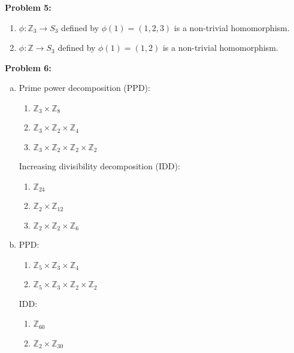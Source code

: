 \documentclass[12pt, letterpaper]{article}
\newenvironment{problem}
    [1]
    {\noindent \textbf{Problem #1:}}
    {\vspace{3mm}}
\begin{document}
\begin{problem}{5}
\begin{enumerate}
        \item $\phi: \mathbb{Z}_3 \rightarrow S_3$ defined by $\phi(1) = (1,2,3)$ is a non-trivial
        homomorphism.

        \item $\phi: \mathbb{Z} \rightarrow S_3$ defined by $\phi(1) = (1,2)$
        is a non-trivial homomorphism.
    \end{enumerate}
\end{problem}

\begin{problem}{6}
    \begin{enumerate}[(a)]
        \item Prime power decomposition (PPD): 
        
        \begin{enumerate}[1.]
            \item $\mathbb{Z}_3 \times \mathbb{Z}_8$
            \item $\mathbb{Z}_3 \times \mathbb{Z}_2 \times \mathbb{Z}_4$
            \item $\mathbb{Z}_3 \times \mathbb{Z}_2 \times \mathbb{Z}_2 \times \mathbb{Z}_2$
        \end{enumerate}
        
        Increasing divisibility decomposition (IDD):
        \begin{enumerate}[1.]
            \item $\mathbb{Z}_{24}$
            \item $\mathbb{Z}_2 \times \mathbb{Z}_{12}$
            \item $\mathbb{Z}_2 \times \mathbb{Z}_2 \times \mathbb{Z}_{6}$
        \end{enumerate}

        \item PPD: 
        \begin{enumerate}[1.]
            \item $\mathbb{Z}_5 \times \mathbb{Z}_3 \times \mathbb{Z}_4$
            \item $\mathbb{Z}_5 \times \mathbb{Z}_3 \times \mathbb{Z}_2 \times \mathbb{Z}_2$
        \end{enumerate}
        
        IDD:
        \begin{enumerate}[1.]
            \item $\mathbb{Z}_{60}$
            \item $\mathbb{Z}_2 \times \mathbb{Z}_{30}$
        \end{enumerate}


\end{enumerate}
\end{problem}
\end{document}
